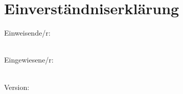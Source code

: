\section{Einverständniserklärung}
Einweisende/r:\\
\begin{Form}
\end{Form}
\leavevmode
~\\
Eingewiesene/r:\\
\begin{Form}
\end{Form}
\leavevmode
~\\
Version: \immediate{}

